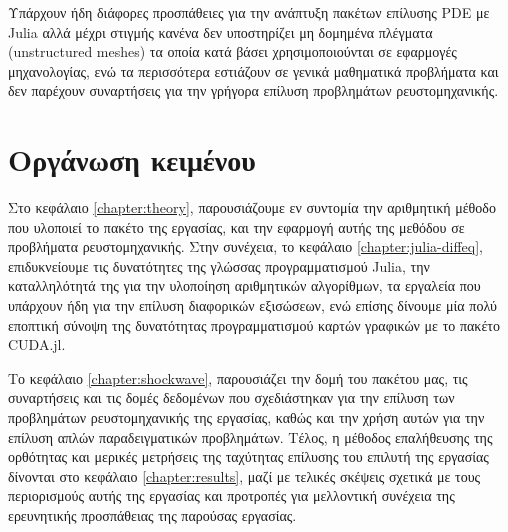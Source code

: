 Υπάρχουν ήδη διάφορες προσπάθειες για την ανάπτυξη πακέτων επίλυσης PDE με Julia αλλά μέχρι στιγμής κανένα δεν υποστηρίζει μη δομημένα πλέγματα (unstructured meshes) τα οποία κατά βάσει χρησιμοποιούνται σε εφαρμογές μηχανολογίας, ενώ τα περισσότερα εστιάζουν σε γενικά μαθηματικά προβλήματα και δεν παρέχουν συναρτήσεις για την γρήγορα επίλυση προβλημάτων ρευστομηχανικής.

\section{Οργάνωση κειμένου}

Στο κεφάλαιο \ref{chapter:theory}, παρουσιάζουμε εν συντομία την αριθμητική μέθοδο που υλοποιεί το πακέτο της εργασίας, και την εφαρμογή αυτής της μεθόδου σε προβλήματα ρευστομηχανικής.
Στην συνέχεια, το κεφάλαιο \ref{chapter:julia-diffeq}, επιδυκνείουμε τις δυνατότητες της γλώσσας προγραμματισμού Julia, την καταλληλότητά της για την υλοποίηση αριθμητικών αλγορίθμων, τα εργαλεία που υπάρχουν ήδη για την επίλυση διαφορικών εξισώσεων, ενώ επίσης δίνουμε μία πολύ εποπτική σύνοψη της δυνατότητας προγραμματισμού καρτών γραφικών με το πακέτο CUDA.jl.

Το κεφάλαιο \ref{chapter:shockwave}, παρουσιάζει την δομή του πακέτου μας, τις συναρτήσεις και τις δομές δεδομένων που σχεδιάστηκαν για την επίλυση των προβλημάτων ρευστομηχανικής της εργασίας, καθώς και την χρήση αυτών για την επίλυση απλών παραδειγματικών προβλημάτων.
Τέλος, η μέθοδος επαλήθευσης της ορθότητας και μερικές μετρήσεις της ταχύτητας επίλυσης του επιλυτή της εργασίας δίνονται στο κεφάλαιο \ref{chapter:results}, μαζί με τελικές σκέψεις σχετικά με τους περιορισμούς αυτής της εργασίας και προτροπές για μελλοντική συνέχεια της ερευνητικής προσπάθειας της παρούσας εργασίας.


